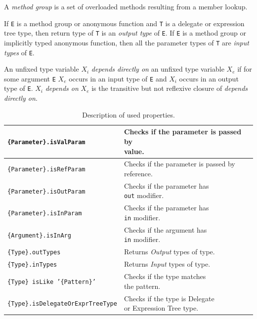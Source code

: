\begin{defn}
A \emph{method group} is a set of overloaded methods resulting from a member lookup.
\end{defn}
\begin{defn}
If \texttt{E} is a method group or anonymous function and \texttt{T} is a delegate or expression tree type, then return type of \texttt{T} is an \emph{output type} of \texttt{E}.
If \texttt{E} is a method group or implicitly typed anonymous function, then all the parameter types of \texttt{T} are \emph{input types} of \texttt{E}. 
\end{defn}
\begin{defn}[Dependence]
An unfixed type variable \texttt{$X_i$} \emph{depends directly on} an unfixed type variable \texttt{$X_e$} if for some argument \texttt{E} \texttt{$X_e$} occurs in an input type of \texttt{E} and \texttt{$X_i$} occurs in an output type of \texttt{E}.
\texttt{$X_i$} \emph{depends on} \texttt{$X_e$} is the transitive but not reflexive closure of \emph{depends directly on}.
\end{defn}
\begin{table}[h]
\begin{center}
\begin{tabular}{ | l | l | } 
  \hline
  \texttt{\{Parameter\}.isValParam} & \makecell[lc]{Checks if the parameter is passed by\\ value.}\\ 
  \hline
  \texttt{\{Parameter\}.isRefParam} & \makecell[lc]{Checks if the parameter is passed by\\ reference.} \\ 
  \hline
  \texttt{\{Parameter\}.isOutParam} &\makecell[lc]{ Checks if the parameter has\\ \texttt{out} modifier.}\\ 
  \hline
  \texttt{\{Parameter\}.isInParam} & \makecell[lc]{Checks if the parameter has\\ \texttt{in} modifier.}\\ 
  \hline
  \texttt{\{Argument\}.isInArg} & \makecell[lc]{Checks if the argument has\\ \texttt{in} modifier.}\\ 
  \hline
  \texttt{\{Type\}.outTypes} & Returns \textit{Output} types of type.\\ 
  \hline
  \texttt{\{Type\}.inTypes} & Returns \textit{Input} types of type.\\ 
  \hline
  \texttt{\{Type\} isLike '\{Pattern\}'} & \makecell[lc]{Checks if the type matches\\ the pattern.}\\ 
  \hline
  \texttt{\{Type\}.isDelegateOrExprTreeType} & \makecell[lc]{Checks if the type is Delegate\\ or Expression Tree type.}\\ 
  \hline
\end{tabular}
\end{center}
\caption{Description of used properties.}
\label{table1:algorithmLegen}
\end{table}

